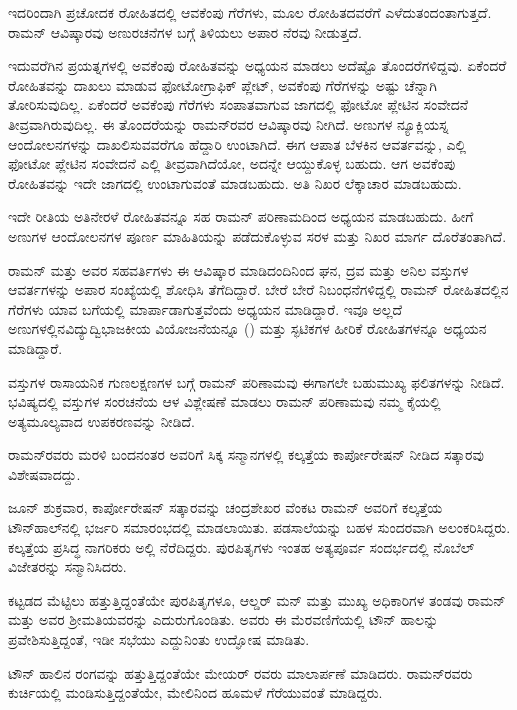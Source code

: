 ಇದರಿಂದಾಗಿ ಪ್ರಚೋದಕ ರೋಹಿತದಲ್ಲಿ ಆವಕೆಂಪು ಗೆರೆಗಳು, ಮೂಲ ರೋಹಿತದವರೆಗೆ ಎಳೆದುತಂದಂತಾಗುತ್ತದೆ. ರಾಮನ್ ಆವಿಷ್ಕಾರವು ಅಣುರಚನೆಗಳ ಬಗ್ಗೆ ತಿಳಿಯಲು ಅಪಾರ ನೆರವು ನೀಡುತ್ತದೆ.

ಇದುವರೆಗಿನ ಪ್ರಯತ್ನಗಳಲ್ಲಿ ಅವಕೆಂಪು ರೋಹಿತವನ್ನು ಅಧ್ಯಯನ ಮಾಡಲು ಅದೆಷ್ಟೊ ತೊಂದರೆಗಳಿದ್ದವು. ಏಕೆಂದರೆ ರೋಹಿತವನ್ನು ದಾಖಲು ಮಾಡುವ ಫೋಟೋಗ್ರಾಫಿಕ್ ಪ್ಲೇಟ್, ಅವಕೆಂಪು ಗೆರೆಗಳನ್ನು ಅಷ್ಟು ಚೆನ್ನಾಗಿ ತೋರಿಸುವುದಿಲ್ಲ. ಏಕೆಂದರೆ ಅವಕೆಂಪು ಗೆರೆಗಳು ಸಂಪಾತವಾಗುವ ಜಾಗದಲ್ಲಿ ಫೋಟೋ ಪ್ಲೇಟಿನ ಸಂವೇದನೆ ತೀವ್ರವಾಗಿರುವುದಿಲ್ಲ. ಈ ತೊಂದರೆಯನ್ನು ರಾಮನ್‍ರವರ ಆವಿಷ್ಕಾರವು ನೀಗಿದೆ. ಅಣುಗಳ ನ್ಯೂಕ್ಲಿಯಸ್ನ ಆಂದೋಲನಗಳನ್ನು ದಾಖಲಿಸುವವರೆಗೂ ಹೆದ್ದಾರಿ ಉಂಟಾಗಿದೆ. ಈಗ ಆಪಾತ ಬೆಳಕಿನ ಆವರ್ತವನ್ನು, ಎಲ್ಲಿ ಫೋಟೋ ಪ್ಲೇಟಿನ ಸಂವೇದನೆ ಎಲ್ಲಿ ತೀವ್ರವಾಗಿದೆಯೋ, ಅದನ್ನೇ ಆಯ್ದುಕೊಳ್ಳ ಬಹುದು. ಆಗ ಅವಕೆಂಪು ರೋಹಿತವನ್ನು ಇದೇ ಜಾಗದಲ್ಲಿ ಉಂಟಾಗುವಂತೆ ಮಾಡಬಹುದು. ಅತಿ ನಿಖರ ಲೆಕ್ಕಾಚಾರ ಮಾಡಬಹುದು.

ಇದೇ ರೀತಿಯ ಅತಿನೇರಳೆ ರೋಹಿತವನ್ನೂ ಸಹ ರಾಮನ್ ಪರಿಣಾಮದಿಂದ ಅಧ್ಯಯನ ಮಾಡಬಹುದು. ಹೀಗೆ ಅಣುಗಳ ಆಂದೋಲನಗಳ ಪೂರ್ಣ ಮಾಹಿತಿಯನ್ನು ಪಡೆದುಕೊಳ್ಳುವ ಸರಳ ಮತ್ತು ನಿಖರ ಮಾರ್ಗ ದೊರೆತಂತಾಗಿದೆ.

ರಾಮನ್ ಮತ್ತು ಅವರ ಸಹವರ್ತಿಗಳು ಈ ಆವಿಷ್ಕಾರ ಮಾಡಿದಂದಿನಿಂದ ಘನ, ದ್ರವ ಮತ್ತು ಅನಿಲ ವಸ್ತುಗಳ ಆವರ್ತಗಳನ್ನು ಅಪಾರ ಸಂಖ್ಯೆಯಲ್ಲಿ ಶೋಧಿಸಿ ತೆಗೆದಿದ್ದಾರೆ. ಬೇರೆ ಬೇರೆ ನಿಬಂಧನೆಗಳಿದ್ದಲ್ಲಿ ರಾಮನ್ ರೋಹಿತದಲ್ಲಿನ ಗೆರೆಗಳು ಯಾವ ಬಗೆಯಲ್ಲಿ ಮಾರ್ಪಾಡಾಗುತ್ತವೆಂದು ಅಧ್ಯಯನ ಮಾಡಿದ್ದಾರೆ. ಇವೂ ಅಲ್ಲದೆ ಅಣುಗಳಲ್ಲಿನ\break ವಿದ್ಯುದ್ವಿಭಾಜಕೀಯ ವಿಯೋಜನೆಯನ್ನೂ () ಮತ್ತು ಸ್ಫಟಿಕಗಳ ಹೀರಿಕೆ ರೋಹಿತಗಳನ್ನೂ ಅಧ್ಯಯನ ಮಾಡಿದ್ದಾರೆ.

ವಸ್ತುಗಳ ರಾಸಾಯನಿಕ ಗುಣಲಕ್ಷಣಗಳ ಬಗ್ಗೆ ರಾಮನ್ ಪರಿಣಾಮವು ಈಗಾಗಲೇ ಬಹುಮುಖ್ಯ ಫಲಿತಗಳನ್ನು ನೀಡಿದೆ. ಭವಿಷ್ಯದಲ್ಲಿ ವಸ್ತುಗಳ ಸಂರಚನೆಯ ಆಳ ವಿಶ್ಲೇಷಣೆ ಮಾಡಲು ರಾಮನ್ ಪರಿಣಾಮವು ನಮ್ಮ ಕೈಯಲ್ಲಿ ಅತ್ಯಮೂಲ್ಯವಾದ ಉಪಕರಣವನ್ನು ನೀಡಿದೆ.

\newpage


ರಾಮನ್‍ರವರು ಮರಳಿ ಬಂದನಂತರ ಅವರಿಗೆ ಸಿಕ್ಕ ಸನ್ಮಾನಗಳಲ್ಲಿ ಕಲ್ಕತ್ತೆಯ ಕಾರ್ಪೋರೇಷನ್ ನೀಡಿದ ಸತ್ಕಾರವು ವಿಶೇಷವಾದದ್ದು.

ಜೂನ್  ಶುಕ್ರವಾರ, ಕಾರ್ಪೋರೇಷನ್ ಸತ್ಕಾರವನ್ನು ಚಂದ್ರಶೇಖರ ವೆಂಕಟ ರಾಮನ್ ಅವರಿಗೆ ಕಲ್ಕತ್ತೆಯ ಟೌನ್‍ಹಾಲ್‍ನಲ್ಲಿ ಭರ್ಜರಿ ಸಮಾರಂಭದಲ್ಲಿ ಮಾಡಲಾಯಿತು. ಪಡಸಾಲೆಯನ್ನು ಬಹಳ ಸುಂದರವಾಗಿ ಅಲಂಕರಿಸಿದ್ದರು. ಕಲ್ಕತ್ತೆಯ ಪ್ರಸಿದ್ಧ ನಾಗರಿಕರು ಅಲ್ಲಿ ನೆರೆದಿದ್ದರು. ಪುರಪಿತೃಗಳು ಇಂತಹ ಅತ್ಯಪೂರ್ವ ಸಂದರ್ಭದಲ್ಲಿ ನೊಬೆಲ್ ವಿಜೇತರನ್ನು ಸನ್ಮಾನಿಸಿದರು.

ಕಟ್ಟಡದ ಮೆಟ್ಟಿಲು ಹತ್ತುತ್ತಿದ್ದಂತೆಯೇ ಪುರಪಿತೃಗಳೂ, ಆಲ್ಡರ್ ಮನ್ ಮತ್ತು ಮುಖ್ಯ ಅಧಿಕಾರಿಗಳ ತಂಡವು ರಾಮನ್ ಮತ್ತು ಅವರ ಶ‍್ರೀಮತಿಯವರನ್ನು ಎದುರುಗೊಂಡಿತು. ಅವರು ಈ ಮೆರವಣಿಗೆಯಲ್ಲಿ ಟೌನ್ ಹಾಲನ್ನು ಪ್ರವೇಶಿಸುತ್ತಿದ್ದಂತೆ, ಇಡೀ ಸಭೆಯು ಎದ್ದುನಿಂತು ಉದ್ಘೋಷ ಮಾಡಿತು.

ಟೌನ್ ಹಾಲಿನ ರಂಗವನ್ನು ಹತ್ತುತ್ತಿದ್ದಂತೆಯೇ ಮೇಯರ್ ರವರು ಮಾಲಾರ್ಪಣೆ ಮಾಡಿದರು. ರಾಮನ್‍ರವರು ಕುರ್ಚಿಯಲ್ಲಿ ಮಂಡಿಸುತ್ತಿದ್ದಂತೆಯೇ, ಮೇಲಿನಿಂದ ಹೂಮಳೆ ಗೆರೆಯುವಂತೆ ಮಾಡಿದ್ದರು.

